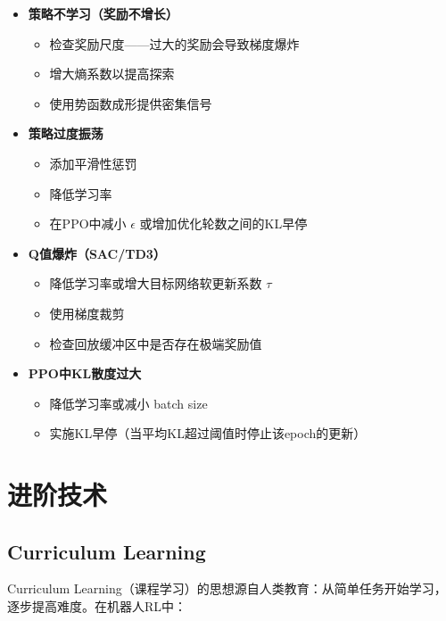 \begin{itemize}
    \item \textbf{策略不学习（奖励不增长）}
    \begin{itemize}
        \item 检查奖励尺度——过大的奖励会导致梯度爆炸
        \item 增大熵系数以提高探索
        \item 使用势函数成形提供密集信号
    \end{itemize}
    \item \textbf{策略过度振荡}
    \begin{itemize}
        \item 添加平滑性惩罚
        \item 降低学习率
        \item 在PPO中减小 $\epsilon$ 或增加优化轮数之间的KL早停
    \end{itemize}
    \item \textbf{Q值爆炸（SAC/TD3）}
    \begin{itemize}
        \item 降低学习率或增大目标网络软更新系数 $\tau$
        \item 使用梯度裁剪
        \item 检查回放缓冲区中是否存在极端奖励值
    \end{itemize}
    \item \textbf{PPO中KL散度过大}
    \begin{itemize}
        \item 降低学习率或减小 batch size
        \item 实施KL早停（当平均KL超过阈值时停止该epoch的更新）
    \end{itemize}
\end{itemize}

\section{进阶技术}

\subsection{Curriculum Learning}

Curriculum Learning（课程学习）的思想源自人类教育：从简单任务开始学习，逐步提高难度。在机器人RL中：

